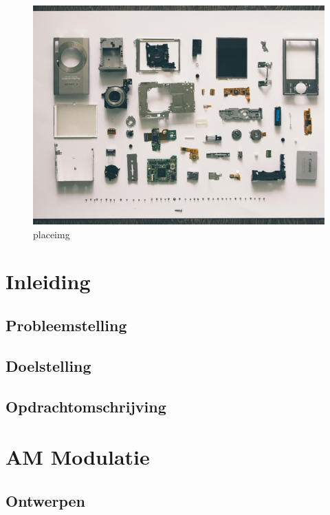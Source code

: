 \documentclass[11pt,a4paper]{article}
\begin{document}
	\begin{figure}[H]
		\includegraphics[width=1.0\textwidth]{placeimg}\par\vspace{1cm}
		\caption{placeimg}
		\label{fig:length_eight_mouse}
	\end{figure}
	\clearpage
	
	\section{Inleiding}
		\subsection{Probleemstelling}
		\subsection{Doelstelling}
		\subsection{Opdrachtomschrijving}
	\clearpage

	\section{AM Modulatie}
		\subsection{Ontwerpen}
			
\end{document}
